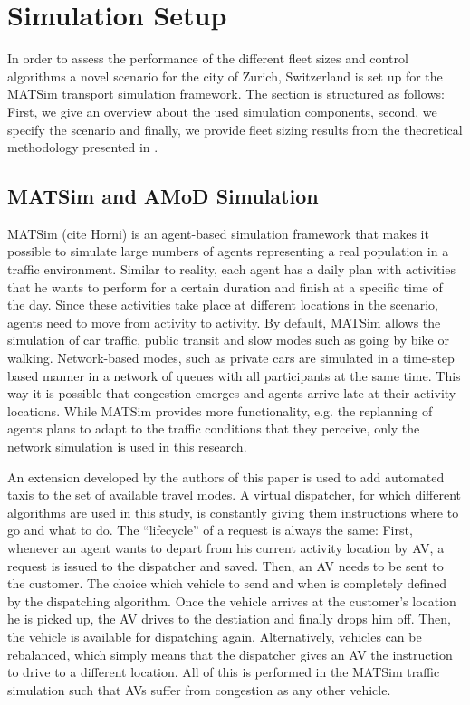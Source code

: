 \section{Simulation Setup}

In order to assess the performance of the different fleet sizes and control
algorithms a novel scenario for the city of Zurich, Switzerland is set up
for the MATSim transport simulation framework. The section is structured as follows:
First, we give an overview about the used simulation components, second, we specify
the scenario and finally, we provide fleet sizing results from the theoretical
methodology presented in \citep{spieser2014toward}.

\subsection{MATSim and AMoD Simulation}

MATSim (cite Horni) is an agent-based simulation framework that makes it possible
to simulate large numbers of agents representing a real population in a traffic environment. Similar to reality, each agent has a daily plan with activities
that he wants to perform for a certain duration and finish at a specific time of
the day. Since these activities take place at different locations in the scenario,
agents need to move from activity to activity. By default, MATSim allows the
simulation of car traffic, public transit and slow modes such as going by bike
or walking. Network-based modes, such as private cars are simulated in a time-step
based manner in a network of queues with all participants at the same time. This
way it is possible that congestion emerges and agents arrive late at their
activity locations. While MATSim provides more functionality, e.g. the replanning
of agents plans to adapt to the traffic conditions that they perceive, only the
network simulation is used in this research.

An extension developed by the authors of this paper is used to add automated taxis to the set
of available travel modes. A virtual dispatcher, for which
different algorithms are used in this study, is constantly giving them instructions
where to go and what to do. The ``lifecycle'' of a request is always the same:
First, whenever an agent wants to depart from his current activity location by
AV, a request is issued to the dispatcher and saved. Then, an AV needs to be sent
to the customer. The choice which vehicle to send and when is completely defined
by the dispatching algorithm. Once the vehicle arrives at the customer's location
he is picked up, the AV drives to the destiation and finally drops him off. Then,
the vehicle is available for dispatching again. Alternatively, vehicles can be
rebalanced, which simply means that the dispatcher gives an AV the instruction
to drive to a different location. All of this is performed in the MATSim traffic
simulation such that AVs suffer from congestion as any other vehicle.

